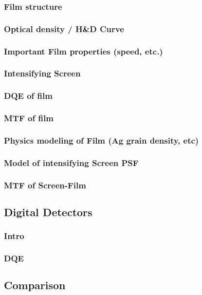 \documentclass[11pt]{article}
\begin{document}
\subsubsection{Film structure}
\subsubsection{Optical density / H\&D Curve}
\subsubsection{Important Film properties (speed, etc.)}
\subsubsection{Intensifying Screen}
\subsubsection{DQE of film}
\subsubsection{MTF of film}
\subsubsection{Physics modeling of Film (Ag grain density, etc)}
\subsubsection{Model of intensifying Screen PSF}
\subsubsection{MTF of Screen-Film}
\subsection{Digital Detectors}
\subsubsection{Intro}
\subsubsection{DQE}
\subsection{Comparison}

\newpage
\end{document}
